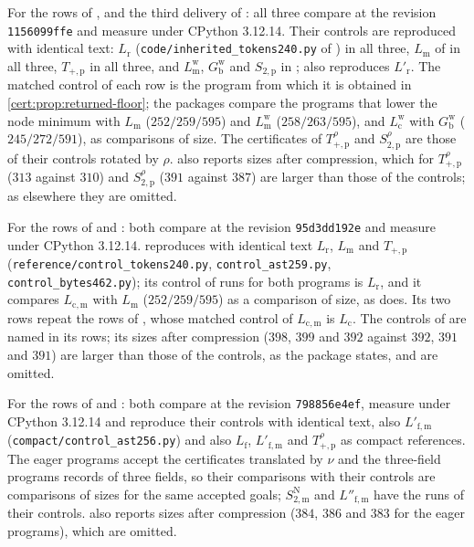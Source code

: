 For the rows of ,  and
the third delivery of : all three compare at the
revision \texttt{1156099ffe} and measure under CPython 3.12.14. Their controls
are reproduced with identical text: $L_{\mathrm r}$
(\texttt{code/inherited\_tokens240.py} of ) in all
three, $L_{\mathrm m}$ of  in all three, $T_{+,\mathrm p}$ in
all three, and $L^{\mathrm w}_{\mathrm m}$, $G^{\mathrm w}_{\mathrm b}$ and
$S_{2,\mathrm p}$ in ; 
also reproduces $L'_{\mathrm r}$. The matched control of each row is the program
from which it is obtained in \cref{cert:prop:returned-floor}; the packages compare
the programs that lower the node minimum with $L_{\mathrm m}$ ($252/259/595$) and
$L^{\mathrm w}_{\mathrm m}$ ($258/263/595$), and $L^{\mathrm w}_{\mathrm c}$ with
$G^{\mathrm w}_{\mathrm b}$ ($245/272/591$), as comparisons of size. The
certificates of $T^{\rho}_{+,\mathrm p}$ and $S^{\rho}_{2,\mathrm p}$ are those of
their controls rotated by $\rho$.  also reports sizes
after compression, which for $T^{\rho}_{+,\mathrm p}$ ($313$ against $310$) and
$S^{\rho}_{2,\mathrm p}$ ($391$ against $387$) are larger than those of the
controls; as elsewhere they are omitted.

For the rows of  and :
both compare at the revision \texttt{95d3dd192e} and measure under CPython
3.12.14.  reproduces with identical text $L_{\mathrm r}$,
$L_{\mathrm m}$ and $T_{+,\mathrm p}$ (\texttt{reference/control\_tokens240.py},
\texttt{control\_ast259.py}, \texttt{control\_bytes462.py}); its control of runs
for both programs is $L_{\mathrm r}$, and it compares $L_{\mathrm{c,m}}$ with
$L_{\mathrm m}$ ($252/259/595$) as a comparison of size, as
 does. Its two rows repeat the rows of
, whose matched control of $L_{\mathrm{c,m}}$ is
$L_{\mathrm c}$. The controls of  are named in
its rows; its sizes after compression ($398$, $399$ and $392$ against $392$, $391$
and $391$) are larger than those of the controls, as the package states, and are
omitted.

For the rows of  and : both
compare at the revision \texttt{798856e4ef}, measure under CPython 3.12.14 and
reproduce their controls with identical text,  also
$L'_{\mathrm{f,m}}$ (\texttt{compact/control\_ast256.py}) and
 also $L_{\mathrm f}$, $L'_{\mathrm{f,m}}$ and
$T^{\rho}_{+,\mathrm p}$ as compact references. The eager programs accept the
certificates translated by $\nu$ and the three-field programs records of three
fields, so their comparisons with their controls are comparisons of sizes for the
same accepted goals; $S^{\mathrm N}_{2,\mathrm m}$ and $L''_{\mathrm{f,m}}$ have the runs
of their controls.  also reports sizes after compression
($384$, $386$ and $383$ for the eager programs), which are omitted.

